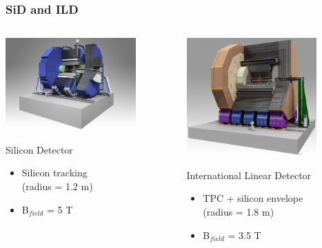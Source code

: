 \documentclass{beamer}
\begin{document}

\begin{frame}
  \frametitle{SiD and ILD}

  \vspace{-0.12cm}
  \begin{columns}[t]
    \begin{column}{5cm}
      \includegraphics[width = 5cm, height = 2.9 cm]{Pictures/ILC_SiD.jpg}
      \vspace{-0.25cm}
      \begin{block}{Silicon Detector}
        \footnotesize{
        \begin{itemize}
          \item Silicon tracking \\ (radius = 1.2 m)
          \item B$_{field}$ = 5 T
        \end{itemize}
        }
      \end{block}
    \end{column}

    \begin{column}{5cm}
      \includegraphics[width = 5cm, height = 2.9 cm]{Pictures/ILD_all_110826.jpg}
      \vspace{-0.25cm}
      \begin{block}{International Linear Detector}
        \footnotesize{
        \begin{itemize}
          \item TPC + silicon envelope \\ (radius = 1.8 m)
          \item B$_{field}$ = 3.5 T
        \end{itemize}
        }
      \end{block}
    \end{column}
  \end{columns}


\end{frame}
\end{document}
